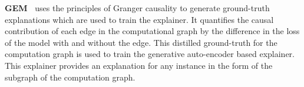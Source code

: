  
 \textbf{GEM~\cite{Gen-causal}} uses the principles of Granger causality to generate ground-truth explanations which are used to train the explainer. It quantifies the causal contribution of each edge in the computational graph by the difference in the loss of the model with and without the edge. This distilled ground-truth for the computation graph is used to train the generative auto-encoder based explainer. This explainer provides an explanation for any instance in the form of the subgraph of the computation graph.
 
 

 
 
 
 


